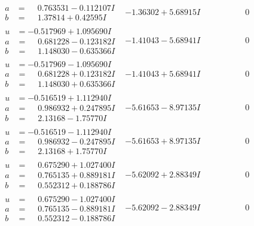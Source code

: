 \documentclass[1p]{elsarticle_modified}
\theoremstyle{definition}
\begin{document}
$$\begin{array}{c|c|c}
\begin{aligned}
a &= \phantom{-}0.763531 - 0.112107 I \\
b &= \phantom{-}1.37814 + 0.42595 I\end{aligned}
 & -1.36302 + 5.68915 I & \phantom{-0.000000 } 0 \\ \hline\begin{aligned}
u &= -0.517969 + 1.095690 I \\
a &= \phantom{-}0.681228 - 0.123182 I \\
b &= \phantom{-}1.148030 - 0.635366 I\end{aligned}
 & -1.41043 - 5.68941 I & \phantom{-0.000000 } 0 \\ \hline\begin{aligned}
u &= -0.517969 - 1.095690 I \\
a &= \phantom{-}0.681228 + 0.123182 I \\
b &= \phantom{-}1.148030 + 0.635366 I\end{aligned}
 & -1.41043 + 5.68941 I & \phantom{-0.000000 } 0 \\ \hline\begin{aligned}
u &= -0.516519 + 1.112940 I \\
a &= \phantom{-}0.986932 + 0.247895 I \\
b &= \phantom{-}2.13168 - 1.75770 I\end{aligned}
 & -5.61653 - 8.97135 I & \phantom{-0.000000 } 0 \\ \hline\begin{aligned}
u &= -0.516519 - 1.112940 I \\
a &= \phantom{-}0.986932 - 0.247895 I \\
b &= \phantom{-}2.13168 + 1.75770 I\end{aligned}
 & -5.61653 + 8.97135 I & \phantom{-0.000000 } 0 \\ \hline\begin{aligned}
u &= \phantom{-}0.675290 + 1.027400 I \\
a &= \phantom{-}0.765135 + 0.889181 I \\
b &= \phantom{-}0.552312 + 0.188786 I\end{aligned}
 & -5.62092 + 2.88349 I & \phantom{-0.000000 } 0 \\ \hline\begin{aligned}
u &= \phantom{-}0.675290 - 1.027400 I \\
a &= \phantom{-}0.765135 - 0.889181 I \\
b &= \phantom{-}0.552312 - 0.188786 I\end{aligned}
 & -5.62092 - 2.88349 I & \phantom{-0.000000 } 0 \\ \hline\begin{aligned}

\end{aligned}
\end{array}$$
\end{document}
